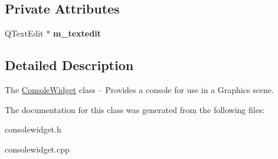 \subsection*{Private Attributes}
\begin{DoxyCompactItemize}
\item 
\mbox{\label{class_console_widget_a8a1debe1a354c1d403b1deea7c25a0aa}} 
Q\+Text\+Edit $\ast$ {\bfseries m\+\_\+textedit}
\end{DoxyCompactItemize}


\subsection{Detailed Description}
The \hyperlink{class_console_widget}{Console\+Widget} class -- Provides a console for use in a Graphics scene. 

The documentation for this class was generated from the following files\+:\begin{DoxyCompactItemize}
\item 
consolewidget.\+h\item 
consolewidget.\+cpp\end{DoxyCompactItemize}
